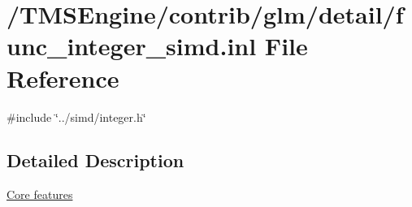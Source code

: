 \hypertarget{func__integer__simd_8inl}{}\section{/\+T\+M\+S\+Engine/contrib/glm/detail/func\+\_\+integer\+\_\+simd.inl File Reference}
\label{func__integer__simd_8inl}
{\ttfamily \#include \char`\"{}../simd/integer.\+h\char`\"{}}\newline


\subsection{Detailed Description}
\hyperlink{group__core}{Core features} 